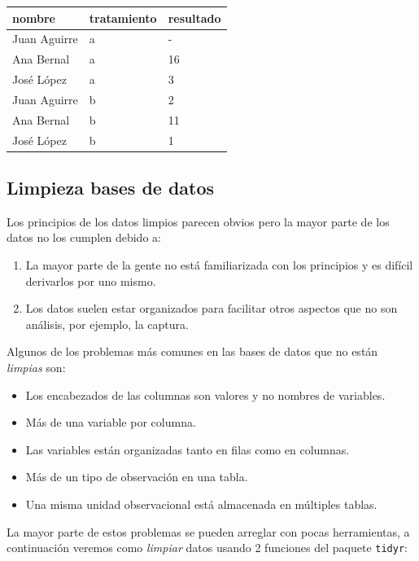 \documentclass[
]{book}
\providecommand{\tightlist}{%
  \setlength{\itemsep}{0pt}\setlength{\parskip}{0pt}}
\begin{document}
\begin{longtable}[]{@{}lll@{}}
\toprule()
nombre & tratamiento & resultado \\
\midrule()
\endhead
Juan Aguirre & a & - \\
Ana Bernal & a & 16 \\
José López & a & 3 \\
Juan Aguirre & b & 2 \\
Ana Bernal & b & 11 \\
José López & b & 1 \\
\bottomrule()
\end{longtable}

\hypertarget{limpieza-bases-de-datos}{%
\subsection*{Limpieza bases de datos}\label{limpieza-bases-de-datos}}

Los principios de los datos limpios parecen obvios pero la mayor parte de los
datos no los cumplen debido a:

\begin{enumerate}
\def\labelenumi{\arabic{enumi}.}
\tightlist
\item
  La mayor parte de la gente no está familiarizada con los principios y es
  difícil derivarlos por uno mismo.\\
\item
  Los datos suelen estar organizados para facilitar otros aspectos que no son
  análisis, por ejemplo, la captura.
\end{enumerate}

Algunos de los problemas más comunes en las bases de datos que no están
\emph{limpias} son:

\begin{itemize}
\tightlist
\item
  Los encabezados de las columnas son valores y no nombres de variables.
\item
  Más de una variable por columna.
\item
  Las variables están organizadas tanto en filas como en columnas.
\item
  Más de un tipo de observación en una tabla.
\item
  Una misma unidad observacional está almacenada en múltiples tablas.
\end{itemize}

La mayor parte de estos problemas se pueden arreglar con pocas herramientas,
a continuación veremos como \emph{limpiar} datos usando 2 funciones del paquete
\texttt{tidyr}:
\end{document}
